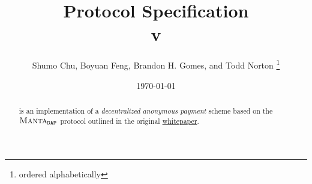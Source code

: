 \documentclass{article}
\title{\textbf{\MantaPay{} Protocol Specification}\\ v}
\author{Shumo Chu, Boyuan Feng, Brandon H. Gomes, and Todd Norton \thanks{ordered alphabetically}}
\date{\today}
\begin{document}
    
\maketitle

\begin{abstract}
    \MantaPay{} is an implementation of a \emph{decentralized anonymous payment} scheme based on the ${{\textsc{Manta}}{}_{\texttt{DAP}}}$ protocol outlined in the original \href{https://eprint.iacr.org/2021/743.pdf}{\Manta{} whitepaper}.
\end{abstract}
    
\tableofcontents
\newpage











\end{document}
